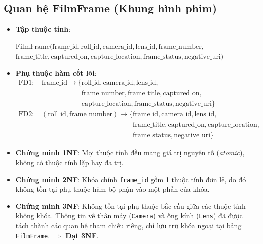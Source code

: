 \subsection{Quan hệ FilmFrame (Khung hình phim)}
\begin{itemize}
    \item \textbf{Tập thuộc tính}: 
    \begin{center}
    $\text{FilmFrame}(\underline{\text{frame\_id}}, \text{roll\_id}, \text{camera\_id}, \text{lens\_id}, \text{frame\_number},$ \\
    $\text{frame\_title}, \text{captured\_on}, \text{capture\_location}, \text{frame\_status}, \text{negative\_uri})$
    \end{center}
    \item \textbf{Phụ thuộc hàm cốt lõi}:
    \begin{align*}
        \text{FD1: } & \text{frame\_id} \longrightarrow \{\text{roll\_id}, \text{camera\_id}, \text{lens\_id}, \\
        & \phantom{\text{frame\_id} \longrightarrow \{} \text{frame\_number}, \text{frame\_title}, \text{captured\_on}, \\
        & \phantom{\text{frame\_id} \longrightarrow \{} \text{capture\_location}, \text{frame\_status}, \text{negative\_uri}\} \\
        \text{FD2: } & (\text{roll\_id}, \text{frame\_number}) \longrightarrow \{\text{frame\_id}, \text{camera\_id}, \text{lens\_id}, \\
        & \phantom{(\text{roll\_id}, \text{frame\_number}) \longrightarrow \{} \text{frame\_title}, \text{captured\_on}, \text{capture\_location}, \\
        & \phantom{(\text{roll\_id}, \text{frame\_number}) \longrightarrow \{} \text{frame\_status}, \text{negative\_uri}\}
    \end{align*}
    \item \textbf{Chứng minh 1NF}: Mọi thuộc tính đều mang giá trị nguyên tố (\textit{atomic}), không có thuộc tính lặp hay đa trị.
    \item \textbf{Chứng minh 2NF}: Khóa chính \texttt{frame\_id} gồm 1 thuộc tính đơn lẻ, do đó không tồn tại phụ thuộc hàm bộ phận vào một phần của khóa.
    \item \textbf{Chứng minh 3NF}: Không tồn tại phụ thuộc bắc cầu giữa các thuộc tính không khóa. Thông tin về thân máy (\texttt{Camera}) và ống kính (\texttt{Lens}) đã được tách thành các quan hệ tham chiếu riêng, chỉ lưu trữ khóa ngoại tại bảng \texttt{FilmFrame}. $\Rightarrow$ \textbf{Đạt 3NF}.
\end{itemize}

